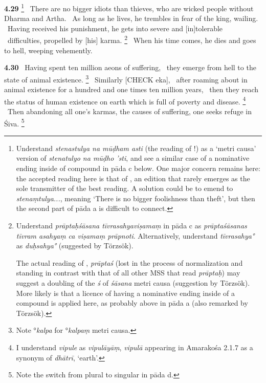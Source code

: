 \documentclass{article}
\newcommand{\skt}[1]{\textit{#1}}
\begin{document}
\textbf{4.29}%
\footnote{Understand \skt{stenastulya na mūḍham{ }asti} (the reading of \Ed!) as a `metri causa' version of                \skt{stenatulyo na mūḍho 'sti}, and see a similar case of a nominative ending                inside of compound in pāda c below. One major concern remains here:                the accepted reading here is that of \Ed, an edition that rarely emerges as                 the sole transmitter of the best reading. A solution could be                 to emend to \skt{stenaṃtulya...}, meaning `There is no bigger foolishness than theft',                but then the second part of pāda a is difficult to connect.                 

  }%
\ There are no bigger idiots than thieves, who are wicked people without Dharma and Artha.%
\ As long as he lives, he trembles in fear of the king, wailing.%
\ Having received his punishment, he gets into severe and [in]tolerable%
\                                  difficulties, propelled by [his] karma.%
\footnote{Understand \skt{prāptaḥśāsana tīvrasahyaviṣamaṃ} in pāda c as \skt{prāptaśāsanas tīvram asahyaṃ ca viṣamaṃ prāpnoti}.                Alternatively, understand \skt{tīvrasahya°} as \skt{duḥsahya°} (suggested by Törzsök).                

                The actual reading of \msCa, \skt{prāptaś} (lost in the process of normalization and standing                        in contrast with that of all other MSS that read \skt{prāptaḥ}) may suggest                        a doubling of the \skt{ś} of \skt{śāsana} metri causa (suggestion by Törzsök).                        More likely is that a licence of having a nominative ending inside of a compound                        is applied here, as probably above in pāda a (also remarked by Törzsök). }%
\ When his time comes, he dies and goes to hell, weeping vehemently.%


\textbf{4.30}%
\ Having spent ten million aeons of suffering,%
\                                  they emerge from hell to the state of animal existence.%
\footnote{Note °\skt{kalpa} for °\skt{kalpaṃ} metri causa. }%
\ Similarly [CHECK eka],%
\                 after roaming about in animal existence for a hundred and one times ten million years,%
\ then they reach the status of human existence on earth which is full of poverty and disease.%
\footnote{I understand \skt{vipule} as \skt{vipulāyāṃ}, \skt{vipulā} appearing in Amarakośa 2.1.7 as a synonym of                        \skt{dhātrī}, `earth'. }%
\ Then abandoning all one's karmas, the causes of suffering, one seeks refuge in Śiva.%
\footnote{Note the switch from plural to singular in pāda d. }%
\end{document}
